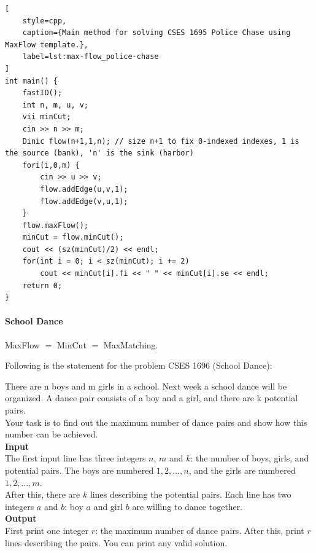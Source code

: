 \documentclass[letterpaper,landscape]{article}
\begin{document}
\begin{lstlisting}[
    style=cpp,
    caption={Main method for solving CSES 1695 Police Chase using MaxFlow template.},
    label=lst:max-flow_police-chase
]
int main() {
    fastIO();
    int n, m, u, v;
    vii minCut;
    cin >> n >> m;
    Dinic flow(n+1,1,n); // size n+1 to fix 0-indexed indexes, 1 is the source (bank), 'n' is the sink (harbor)
    fori(i,0,m) {
        cin >> u >> v;
        flow.addEdge(u,v,1);
        flow.addEdge(v,u,1);
    }
    flow.maxFlow();
    minCut = flow.minCut();
    cout << (sz(minCut)/2) << endl;
    for(int i = 0; i < sz(minCut); i += 2)
        cout << minCut[i].fi << " " << minCut[i].se << endl;
    return 0;
}
\end{lstlisting}

\paragraph{School Dance}

MaxFlow $=$ MinCut $=$ MaxMatching.

Following is the statement for the problem CSES 1696 (School Dance):

\begin{IOFrame}
\sffamily\raggedright
\setlength{\parindent}{0pt}
\setlength{\parskip}{0.4em}
There are n boys and m girls in a school. Next week a school dance will be organized. A dance pair consists of a boy and a girl, and there are k potential pairs. \\[0.2cm]
Your task is to find out the maximum number of dance pairs and show how this number can be achieved. \\

\textbf{Input} \\[0.1cm]

\noindent The first input line has three integers $n$, $m$ and $k$: the number of boys, girls, and potential pairs. The boys are numbered $1,2,\dots,n$, and the girls are numbered $1,2,\dots,m$. \\[0.2cm]
After this, there are $k$ lines describing the potential pairs. Each line has two integers $a$ and $b$: boy $a$ and girl $b$ are willing to dance together. \\

\textbf{Output} \\[0.1cm]

\noindent First print one integer $r$: the maximum number of dance pairs. After this, print $r$ lines describing the pairs. You can print any valid solution.
\end{IOFrame}
\end{document}
